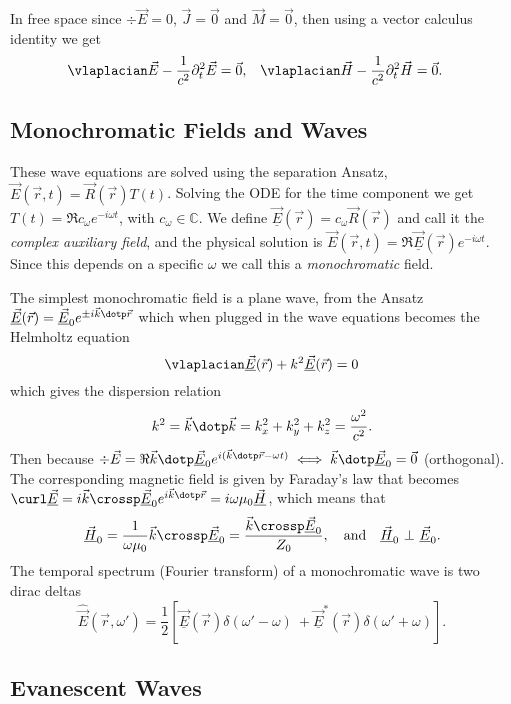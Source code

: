\documentclass[margin=tiny]{hsrzf}
\newcommand{\cvec}[1]{\underline{\vec{#1}}}
\begin{document}
In free space since $\div \vec{E} = 0$, $\vec{J} = \vec{0}$ and $\vec{M} =
\vec{0}$, then using a vector calculus identity we get
\begin{align*}
  \vlaplacian \vec{E} - \frac{1}{c^2} \partial^2_t \vec{E} &= \vec{0}, &
  \vlaplacian \vec{H} - \frac{1}{c^2} \partial^2_t \vec{H} &= \vec{0}. &
\end{align*}

\subsection{Monochromatic Fields and Waves}

These wave equations are solved using the separation Ansatz, $\vec{E}(\vec{r},
t) = \vec{R}(\vec{r}) T(t)$. Solving the ODE for the time component we get
$T(t) = \Re{c_\omega e^{-i\omega t}}$, with $c_\omega \in \mathbb{C}$. We
define $\cvec{E}(\vec{r}) = c_\omega \vec{R}(\vec{r})$ and call it the
\emph{complex auxiliary field}, and the physical solution is $\vec{E}(\vec{r},
t) = \Re{\cvec{E}(\vec{r})e^{-i\omega t}}$. Since this depends on a specific
$\omega$ we call this a \emph{monochromatic} field.

The simplest monochromatic field is a plane wave, from the Ansatz
$\cvec{E}(\vec{r}) = \cvec{E}_0 e^{\pm i\vec{k} \dotp \vec{r}}$ which when
plugged in the wave equations becomes the Helmholtz equation
\[
  \vlaplacian \cvec{E}(\vec{r}) + k^2 \cvec{E}(\vec{r}) = 0
\]
which gives the dispersion relation
\[
  k^2 = \vec{k} \dotp \vec{k} = k_x^2 + k_y^2 + k_z^2 =
  \frac{\omega^2}{c^2}.
\]
Then because $\div \vec{E} = \Re{\vec{k} \dotp \cvec{E}_0 e^{i(\vec{k}
\dotp\vec{r} - \omega t)}} \iff \vec{k} \dotp \cvec{E}_0 = \vec{0}$
(orthogonal). The corresponding magnetic field is given by Faraday's law that
becomes $\curl \cvec{E} = i\vec{k} \crossp \cvec{E}_0 e^{i\vec{k}\dotp
\vec{r}} = i\omega \mu_0 \cvec{H}$, which means that
\[
  \cvec{H}_0 = \frac{1}{\omega \mu_0} \vec{k} \crossp \cvec{E}_0 =
  \frac{\vec{k} \crossp \cvec{E}_0}{Z_0},
  \quad \text{and} \quad
  \cvec{H}_0 ~\bot~ \cvec{E}_0.
\]
The temporal spectrum (Fourier transform) of a monochromatic wave is two dirac deltas
\[
  \hat{\vec{E}}(\vec{r}, \omega') = \frac{1}{2} \left[
    \cvec{E}(\vec{r}) \delta(\omega' - \omega)\
    + \cvec{E}^*(\vec{r}) \delta(\omega' + \omega) \right].
\]

\subsection{Evanescent Waves}
\end{document}
